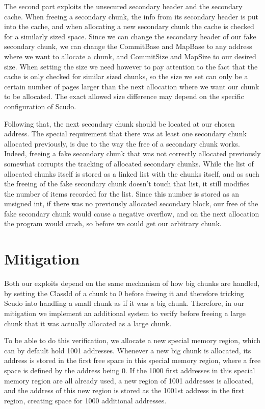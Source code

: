 \documentclass[a4paper,11pt,oneside]{report}
\begin{document}
The second part exploits the unsecured secondary header and the secondary cache. When
freeing a secondary chunk, the info from its secondary header is put into the cache, and
when allocating a new secondary chunk the cache is checked for a similarly sized
space. Since we can change the secondary header of our fake secondary chunk, we can change
the CommitBase and MapBase to any address where we want to allocate a chunk, and
CommitSize and MapSize to our desired size. When setting the size we need however to pay
attention to the fact that the cache is only checked for similar sized chunks, so the size
we set can only be a certain number of pages larger than the next allocation where we want
our chunk to be allocated. The exact allowed size difference may depend on the specific
configuration of Scudo.

Following that, the next secondary chunk should be located at our chosen address. The
special requirement that there was at least one secondary chunk allocated previously, is
due to the way the free of a secondary chunk works. Indeed, freeing a fake secondary chunk
that was not correctly allocated previously somewhat corrupts the tracking of allocated
secondary chunks. While the list of allocated chunks itself is stored as a linked list
with the chunks itself, and as such the freeing of the fake secondary chunk doesn't touch
that list, it still modifies the number of items recorded for the list. Since this number
is stored as an unsigned int, if there was no previously allocated secondary block, our
free of the fake secondary chunk would cause a negative overflow, and on the next
allocation the program would crash, so before we could get our arbitrary chunk.


\chapter{Mitigation}

Both our exploits depend on the same mechanism of how big chunks are handled, by setting
the ClassId of a chunk to 0 before freeing it and therefore tricking Scudo into handling a
small chunk as if it was a big chunk. Therefore, in our mitigation we implement an
additional system to verify before freeing a large chunk that it was actually allocated as
a large chunk.

To be able to do this verification, we allocate a new special memory region, which can by
default hold 1001 addresses. Whenever a new big chunk is allocated, its address is stored
in the first free space in this special memory region, where a free space is defined by
the address being 0. If the 1000 first addresses in this special memory region are all
already used, a new region of 1001 addresses is allocated, and the address of this new
region is stored as the 1001st address in the first region, creating space for 1000
additional addresses.
\end{document}
